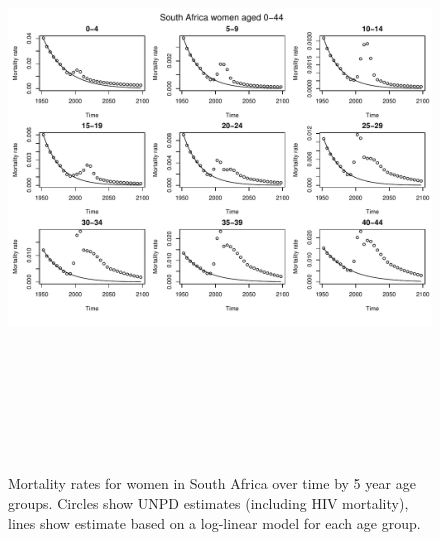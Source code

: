 \documentclass{article}
\begin{document}
\begin{figure}
\includegraphics[width=16cm,height=16cm]{EstimatingRatesFromUNPD-MortalitySAWomen1} 

\caption{Mortality rates for women in South Africa over time by 5 year age groups. Circles show UNPD estimates (including HIV mortality), lines show estimate based on a log-linear model for each age group.}
\label{MortalitySAmen1}
\end{figure}
\end{document}
